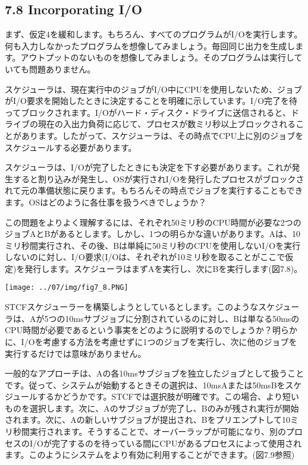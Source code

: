 \hypertarget{incorporating-io}{%
\subsection*{7.8 Incorporating I/O}\label{incorporating-io}}

まず、仮定4を緩和します。もちろん、すべてのプログラムがI/Oを実行します。何も入力しなかったプログラムを想像してみましょう。毎回同じ出力を生成します。アウトプットのないものを想像してみましょう。そのプログラムは実行していても問題ありません。

スケジューラは、現在実行中のジョブがI/O中にCPUを使用しないため、ジョブがI/O要求を開始したときに決定することを明確に示しています。I/O完了を待ってブロックされます。I/Oがハード・ディスク・ドライブに送信されると、ドライブの現在の入出力負荷に応じて、プロセスが数ミリ秒以上ブロックされることがあります。したがって、スケジューラは、その時点でCPU上に別のジョブをスケジュールする必要があります。

スケジューラは、I/Oが完了したときにも決定を下す必要があります。これが発生すると割り込みが発生し、OSが実行されI/Oを発行したプロセスがブロックされて元の準備状態に戻ります。もちろんその時点でジョブを実行することもできます。OSはどのように各仕事を扱うべきでしょうか？

この問題をよりよく理解するには、それぞれ50ミリ秒のCPU時間が必要な2つのジョブAとBがあるとします。しかし、1つの明らかな違いがあります。Aは、10ミリ秒間実行され、その後、Bは単純に50ミリ秒のCPUを使用しないI/Oを実行しないのに対し、I/O要求(I/Oは、それぞれが10ミリ秒を取ることがここで仮定)を発行します。スケジューラはまずAを実行し、次にBを実行します(図7.8)。

\texttt{[image: ../07/img/fig7\_8.PNG]}

STCFスケジューラーを構築しようとしているとします。このようなスケジューラは、Aが5つの10msサブジョブに分割されているのに対し、Bは単なる50msのCPU時間が必要であるという事実をどのように説明するのでしょうか？明らかに、I/Oを考慮する方法を考慮せずに1つのジョブを実行し、次に他のジョブを実行するだけでは意味がありません。

一般的なアプローチは、Aの各10msサブジョブを独立したジョブとして扱うことです。従って、システムが始動するときその選択は、10msAまたは50msBをスケジュールするかどうかです。STCFでは選択肢が明確です。この場合、より短いものを選択します。次に、Aのサブジョブが完了し、Bのみが残され実行が開始されます。次に、Aの新しいサブジョブが提出され、Bをプリエンプトして10ミリ秒間実行されます。そうすることで、オーバーラップが可能になり、別のプロセスのI/Oが完了するのを待っている間にCPUがあるプロセスによって使用されます。このようにシステムをより有効に利用することができます。(図7.9参照)

